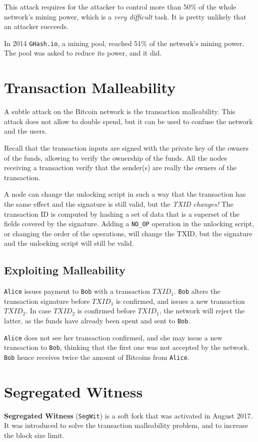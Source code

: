 This attack requires for the attacker to control more than 50\% of the whole network's mining power, which is a \textit{very difficult} task. It is pretty unlikely that an attacker succeeds.

In 2014 \texttt{GHash.io}, a mining pool, reached 51\% of the network's mining power. The pool was asked to reduce its power, and it did.

\section{Transaction Malleability}
A subtle attack on the Bitcoin network is the transaction malleability. This attack does not allow to double spend, but it can be used to confuse the network and the users.

Recall that the transaction inputs are signed with the private key of the owners of the funds, allowing to verify the ownership of the funds.
All the nodes receiving a transaction verify that the sender(s) are really the owners of the transaction.

A node can change the unlocking script in such a way that the transaction has the same effect and the signature is still valid, but the \textit{TXID changes!}
The transaction ID is computed by hashing a set of data that is a superset of the fields covered by the signature.
Adding a \texttt{NO\_OP} operation in the unlocking script, or changing the order of the operations, will change the TXID, but the signature and the unlocking script will still be valid.

\subsection{Exploiting Malleability}
\texttt{Alice} issues payment to \texttt{Bob} with a transaction $TXID_1$.
\texttt{Bob} alters the transaction signature before $TXID_1$ is confirmed, and issues a new transaction $TXID_2$.
In case $TXID_2$ is confirmed before $TXID_1$, the network will reject the latter, as the funds have already been spent and sent to \texttt{Bob}.

\texttt{Alice} does not see her transaction confirmed, and she may issue a new transaction to \texttt{Bob}, thinking that the first one was not accepted by the network.
\texttt{Bob} hence receives twice the amount of Bitcoins from \texttt{Alice}.

\section{Segregated Witness}
\textbf{Segregated Witness} (\texttt{SegWit}) is a soft fork that was activated in August 2017. It was introduced to solve the transaction malleability problem, and to increase the block size limit.

